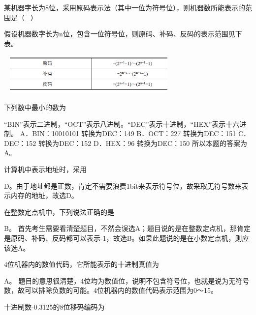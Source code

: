 \question 某机器字长为8位，采用原码表示法（其中一位为符号位），则机器数所能表示的范围是（
~）
\par{}
\begin{solution}假设机器数字长为n位，包含一位符号位，则原码、补码、反码的表示范围见下表。

~
\includegraphics[width=3.33333in,height=0.81250in]{computerassets/F9B4A5C57401D2BDF1DB8B2987BCD52F.png}
\end{solution}
\question 下列数中最小的数为
\par{}
\begin{solution}``BIN''表示二进制，``OCT''表示八进制。``DEC''表示十进制，``HEX''表示十六进制。
A．BIN：10010101 转换为DEC：149 B．OCT：227 转换为DEC：151 C．DEC：152
转换为DEC：152 D．HEX：96 转换为DEC：150 所以本题的答案为A。
\end{solution}
\question 计算机中表示地址时，采用
\par{}
\begin{solution}D。由于地址都是正数，肯定不需要浪费1bit来表示符号位，故采取无符号数来表示内存的地址，故选D。
\end{solution}
\question 在整数定点机中，下列说法正确的是
\par{}
\begin{solution}B。
首先考生需要看清楚题目，不然会误选A；题目说的是在整数定点机，那肯定是原码、补码、反码都可以表示-1，故选B。如果此题说的是在小数定点机，则应该选A。
\end{solution}
\question 4位机器内的数值代码，它所能表示的十进制真值为
\par{}
\begin{solution}A。
题目的意思很清楚，4位均为数值位，说明不包含符号位，也就是说为无符号数，故可以排除负数的可能。4位机器内的数值代码表示范围为0～15。
\end{solution}
\question 十进制数-0.3125的8位移码编码为
\par{}
